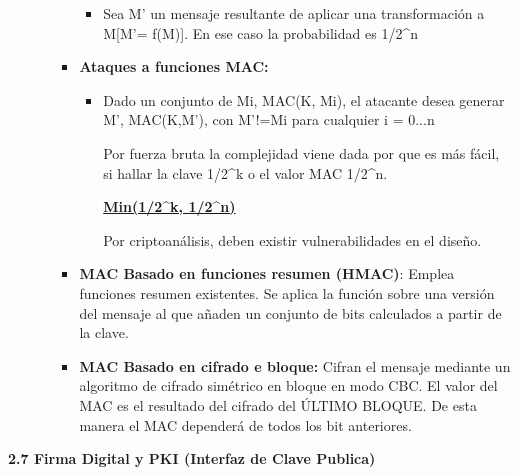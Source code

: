 \documentclass[12pt, twoside, openright]{report} %
\begin{document}
\begin{itemize}
\begin{itemize}
\begin{itemize}
\begin{itemize}
        \item Sea M' un mensaje resultante de aplicar una transformación a
          M{[}M'= f(M){]}. En ese caso la probabilidad es 1/2\^{}n
          
        \end{itemize}
      \item \textbf{Ataques a funciones MAC:}
        

        \begin{itemize}
        \item Dado un conjunto de Mi, MAC(K, Mi), el atacante desea generar
          M', MAC(K,M'), con M'!=Mi para cualquier i = 0...n
          

          
		  
            Por fuerza bruta la complejidad viene dada por que es más
            fácil, si hallar la clave 1/2\^{}k o el valor MAC 1/2\^{}n.
          
			
            \textbf{\underline{Min(1/2\^{}k, 1/2\^{}n)}}
         
			
            Por criptoanálisis, deben existir vulnerabilidades en el
            diseño.
 
			
        \end{itemize}
      \item \textbf{MAC Basado en funciones resumen (HMAC)}: Emplea
        funciones resumen existentes. Se aplica la función sobre una
        versión del mensaje al que añaden un conjunto de bits calculados
        a partir de la clave.
        
      \item \textbf{MAC Basado en cifrado e bloque:} Cifran el mensaje
        mediante un algoritmo de cifrado simétrico en bloque en modo
        CBC. El valor del MAC es el resultado del cifrado del ÚLTIMO
        BLOQUE. De esta manera el MAC dependerá de todos los bit
        anteriores.
        
      \end{itemize}
    \end{itemize}
  \end{itemize}

  
  \textbf{2.7 Firma Digital y PKI (Interfaz de Clave Publica)}
  
\end{document}
